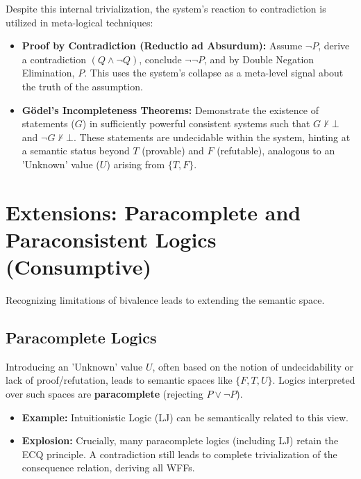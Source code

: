 \documentclass{article}
\begin{document}
	Despite this internal trivialization, the system's reaction to contradiction is utilized in meta-logical techniques:
	\begin{itemize}
		\item \textbf{Proof by Contradiction (Reductio ad Absurdum):} Assume $\neg P$, derive a contradiction $(Q \land \neg Q)$, conclude $\neg \neg P$, and by Double Negation Elimination, $P$. This uses the system's collapse as a meta-level signal about the truth of the assumption.
		\item \textbf{Gödel's Incompleteness Theorems:} Demonstrate the existence of statements ($G$) in sufficiently powerful consistent systems such that $G \nvdash \bot$ and $\neg G \nvdash \bot$. These statements are undecidable within the system, hinting at a semantic status beyond $T$ (provable) and $F$ (refutable), analogous to an 'Unknown' value ($U$) arising from $\{T, F\}$.
	\end{itemize}
	
	\section{Extensions: Paracomplete and Paraconsistent Logics (Consumptive)}
	
	Recognizing limitations of bivalence leads to extending the semantic space.
	
	\subsection{Paracomplete Logics}
	Introducing an 'Unknown' value $U$, often based on the notion of undecidability or lack of proof/refutation, leads to semantic spaces like $\{F, T, U\}$. Logics interpreted over such spaces are \textbf{paracomplete} (rejecting $P \lor \neg P$).
	\begin{itemize}
		\item \textbf{Example:} Intuitionistic Logic (LJ) can be semantically related to this view.
		\item \textbf{Explosion:} Crucially, many paracomplete logics (including LJ) retain the ECQ principle. A contradiction still leads to complete trivialization of the consequence relation, deriving all WFFs.
	\end{itemize}
	
\end{document}
